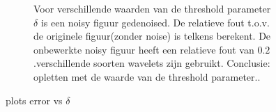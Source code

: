 \begin{figure}
\begin{subfigure}[b]{0.7\textwidth}
        \caption{Voor verschillende waarden van de threshold parameter $\delta$ is een noisy figuur gedenoised. De relatieve fout t.o.v. de originele figuur(zonder noise) is telkens berekent. De onbewerkte noisy figuur heeft een relatieve fout van $0.2$.verschillende soorten wavelets zijn gebruikt. Conclusie: opletten met de waarde van de threshold parameter..}
        \label{fig:mouse}
    \end{subfigure}
    \caption{plots error vs $\delta$}\label{fig:baboon}
\end{figure}



